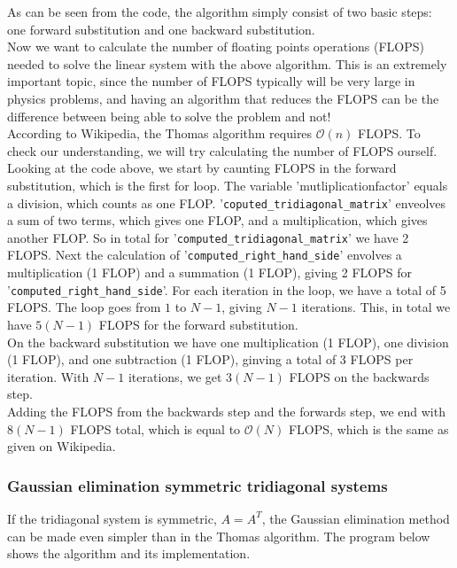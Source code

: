 \documentclass{article}
\begin{document}
As can be seen from the code, the algorithm simply consist of two basic steps: one forward substitution and one backward substitution.\\

Now we want to calculate the number of floating points operations (FLOPS) needed to solve the linear system with the above algorithm. This is an extremely important topic, since the number of FLOPS typically will be very large in physics problems, and having an algorithm that reduces the FLOPS can be the difference between being able to solve the problem and not!\\

According to Wikipedia, the Thomas algorithm requires $\mathcal{O}(n)$ FLOPS. To check our understanding, we will try calculating the number of FLOPS ourself. Looking at the code above, we start by caunting FLOPS in the forward substitution, which is the first for loop. The variable 'mutliplicationfactor' equals a division, which counts as one FLOP. '\texttt{coputed\_tridiagonal\_matrix}' enveolves a sum of two terms, which gives one FLOP, and a multiplication, which gives another FLOP. So in total for '\texttt{computed\_tridiagonal\_matrix}' we have 2 FLOPS. Next the calculation of '\texttt{computed\_right\_hand\_side}' envolves a multiplication (1 FLOP) and a summation (1 FLOP), giving 2 FLOPS for '\texttt{computed\_right\_hand\_side}'. For each iteration in the loop, we have a total of 5 FLOPS. The loop goes from $1$ to $N-1$, giving $N-1$ iterations. This, in total we have $5(N-1)$ FLOPS for the forward substitution.\\

On the backward substitution we have one multiplication (1 FLOP), one division (1 FLOP), and one subtraction (1 FLOP), ginving a total of 3 FLOPS per iteration. With $N-1$ iterations, we get $3(N-1)$ FLOPS on the backwards step.\\

Adding the FLOPS from the backwards step and the forwards step, we end with $8(N-1)$ FLOPS total, which is equal to $\mathcal{O}(N)$ FLOPS, which is the same as given on Wikipedia.

\subsubsection{Gaussian elimination symmetric tridiagonal systems}
If the tridiagonal system is symmetric, $A = A^T$, the Gaussian elimination method can be made even simpler than in the Thomas algorithm. The program below shows the algorithm and its implementation.
\end{document}
